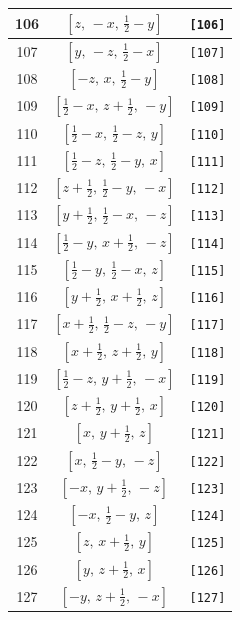 \documentclass[fleqn,8pt]{jsarticle}
\begin{document}
\begin{longtable}{ccc}
106 & $\left[ z,\, - x,\, \frac{1}{2} - y \right]$ & {\tt [106]} \\ \hline
107 & $\left[ y,\, - z,\, \frac{1}{2} - x \right]$ & {\tt [107]} \\ \hline
108 & $\left[ - z,\, x,\, \frac{1}{2} - y \right]$ & {\tt [108]} \\ \hline
109 & $\left[ \frac{1}{2} - x,\, z + \frac{1}{2},\, - y \right]$ & {\tt [109]} \\ \hline
110 & $\left[ \frac{1}{2} - x,\, \frac{1}{2} - z,\, y \right]$ & {\tt [110]} \\ \hline
111 & $\left[ \frac{1}{2} - z,\, \frac{1}{2} - y,\, x \right]$ & {\tt [111]} \\ \hline
112 & $\left[ z + \frac{1}{2},\, \frac{1}{2} - y,\, - x \right]$ & {\tt [112]} \\ \hline
113 & $\left[ y + \frac{1}{2},\, \frac{1}{2} - x,\, - z \right]$ & {\tt [113]} \\ \hline
114 & $\left[ \frac{1}{2} - y,\, x + \frac{1}{2},\, - z \right]$ & {\tt [114]} \\ \hline
115 & $\left[ \frac{1}{2} - y,\, \frac{1}{2} - x,\, z \right]$ & {\tt [115]} \\ \hline
116 & $\left[ y + \frac{1}{2},\, x + \frac{1}{2},\, z \right]$ & {\tt [116]} \\ \hline
117 & $\left[ x + \frac{1}{2},\, \frac{1}{2} - z,\, - y \right]$ & {\tt [117]} \\ \hline
118 & $\left[ x + \frac{1}{2},\, z + \frac{1}{2},\, y \right]$ & {\tt [118]} \\ \hline
119 & $\left[ \frac{1}{2} - z,\, y + \frac{1}{2},\, - x \right]$ & {\tt [119]} \\ \hline
120 & $\left[ z + \frac{1}{2},\, y + \frac{1}{2},\, x \right]$ & {\tt [120]} \\ \hline
121 & $\left[ x,\, y + \frac{1}{2},\, z \right]$ & {\tt [121]} \\ \hline
122 & $\left[ x,\, \frac{1}{2} - y,\, - z \right]$ & {\tt [122]} \\ \hline
123 & $\left[ - x,\, y + \frac{1}{2},\, - z \right]$ & {\tt [123]} \\ \hline
124 & $\left[ - x,\, \frac{1}{2} - y,\, z \right]$ & {\tt [124]} \\ \hline
125 & $\left[ z,\, x + \frac{1}{2},\, y \right]$ & {\tt [125]} \\ \hline
126 & $\left[ y,\, z + \frac{1}{2},\, x \right]$ & {\tt [126]} \\ \hline
127 & $\left[ - y,\, z + \frac{1}{2},\, - x \right]$ & {\tt [127]} \\ \hline

\end{longtable}
\end{document}
